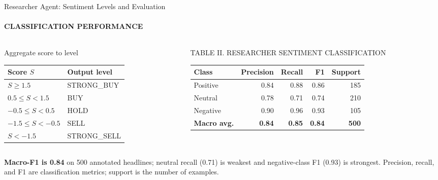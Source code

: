 \documentclass[aspectratio=169,11pt]{beamer}
\newcommand{\keyphrase}[1]{\textbf{\color{DELCONred}#1}}
\begin{document}
\begin{frame}{Researcher Agent: Sentiment Levels and Evaluation}
  \framesubtitle{CLASSIFICATION PERFORMANCE}
  \begin{columns}[T,onlytextwidth]
    \begin{column}{0.45\textwidth}
      \begin{block}{Aggregate score to level}
        \scriptsize
        \begin{tabular}{ll}
          \toprule
          Score $S$ & Output level \\
          \midrule
          $S\geq1.5$ & STRONG\_BUY \\
          $0.5\leq S<1.5$ & BUY \\
          $-0.5\leq S<0.5$ & HOLD \\
          $-1.5\leq S<-0.5$ & SELL \\
          $S<-1.5$ & STRONG\_SELL \\
          \bottomrule
        \end{tabular}
      \end{block}
    \end{column}
    \begin{column}{0.52\textwidth}
      \begin{block}{TABLE II. RESEARCHER SENTIMENT CLASSIFICATION}
        \centering\scriptsize
        \begin{tabular}{lrrrr}
          \toprule
          Class & Precision & Recall & F1 & Support \\
          \midrule
          Positive & 0.84 & 0.88 & 0.86 & 185 \\
          Neutral & 0.78 & 0.71 & 0.74 & 210 \\
          Negative & 0.90 & 0.96 & 0.93 & 105 \\
          \textbf{Macro avg.} & \textbf{0.84} & \textbf{0.85} & \textbf{0.84} & \textbf{500} \\
          \bottomrule
        \end{tabular}
      \end{block}
    \end{column}
  \end{columns}
  \vspace{0.06cm}
  {\scriptsize \keyphrase{Macro-F1 is 0.84} on 500 annotated headlines; neutral recall (0.71) is weakest and negative-class F1 (0.93) is strongest. Precision, recall, and F1 are classification metrics; support is the number of examples.}
\end{frame}
\end{document}
